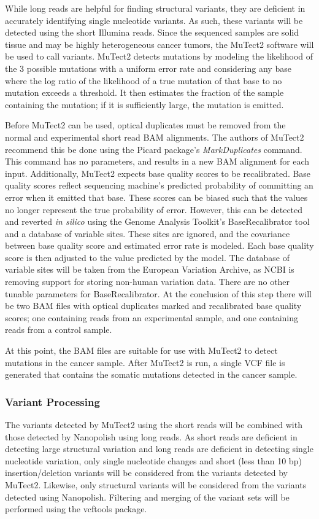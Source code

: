 While long reads are helpful for finding structural variants, they are deficient in accurately identifying single nucleotide variants. As such, these variants will be detected using the short Illumina reads. Since the sequenced samples are solid tissue and may be highly heterogeneous cancer tumors, the MuTect2 software will be used to call variants. MuTect2 detects mutations by modeling the likelihood of the 3 possible mutations with a uniform error rate and considering any base where the log ratio of the likelihood of a true mutation of that base to no mutation exceeds a threshold. It then estimates the fraction of the sample containing the mutation; if it is sufficiently large, the mutation is emitted.

Before MuTect2 can be used, optical duplicates must be removed from the normal and experimental short read BAM alignments. The authors of MuTect2 recommend this be done using the Picard package's \textit{MarkDuplicates} command. This command has no parameters, and results in a new BAM alignment for each input. Additionally, MuTect2 expects base quality scores to be recalibrated. Base quality scores reflect sequencing machine's predicted probability of committing an error when it emitted that base. These scores can be biased such that the values no longer represent the true probability of error. However, this can be detected and reverted \textit{in silico} using the Genome Analysis Toolkit's BaseRecalibrator tool and a database of variable sites. These sites are ignored, and the covariance between base quality score and estimated error rate is modeled. Each base quality score is then adjusted to the value predicted by the model. The database of variable sites will be taken from the European Variation Archive, as NCBI is removing support for storing non-human variation data. There are no other tunable parameters for BaseRecalibrator. At the conclusion of this step there will be two BAM files with optical duplicates marked and recalibrated base quality scores; one containing reads from an experimental sample, and one containing reads from a control sample.

At this point, the BAM files are suitable for use with MuTect2 to detect mutations in the cancer sample. After MuTect2 is run, a single VCF file is generated that contains the somatic mutations detected in the cancer sample.

\subsubsection{Variant Processing}
The variants detected by MuTect2 using the short reads will be combined with those detected by Nanopolish using long reads. As short reads are deficient in detecting large structural variation and long reads are deficient in detecting single nucleotide variation, only single nucleotide changes and short (less than 10 bp) insertion/deletion variants will be considered from the variants detected by MuTect2. Likewise, only structural variants will be considered from the variants detected using Nanopolish.
Filtering and merging of the variant sets will be performed using the vcftools package.

